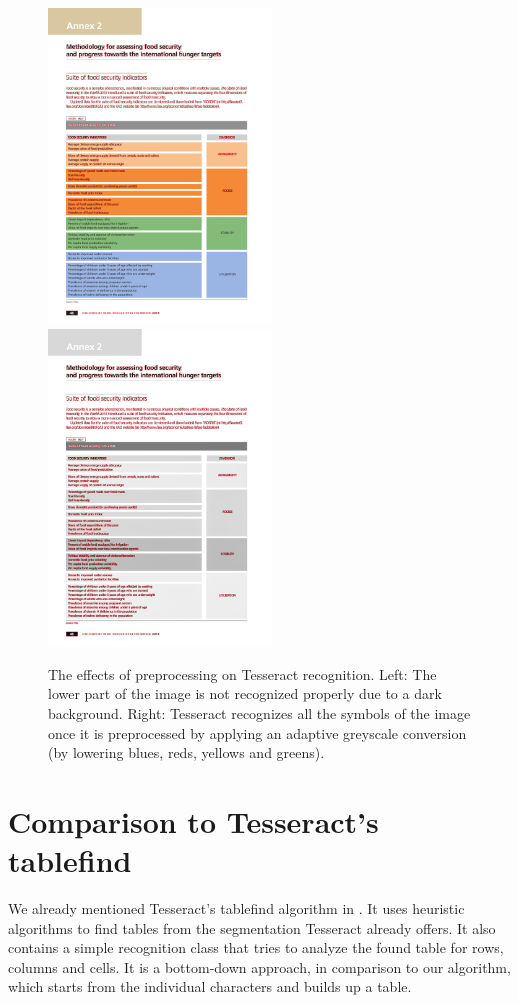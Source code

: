\begin{figure}[t]
\centering

\includegraphics[width=16em]{img/results/im2_noPreproc.png}
\includegraphics[width=16em]{img/results/im2_Preproc.png}

\caption{The effects of preprocessing on Tesseract recognition. Left: The lower part of the image is not recognized properly due to a dark background. Right: Tesseract recognizes all the symbols of the image once it is preprocessed by applying an adaptive greyscale conversion (by lowering blues, reds, yellows and greens).}
\label{fig:preprocessEffectsAdapt}
\end{figure}

\section{Comparison to Tesseract's tablefind}

We already mentioned Tesseract's tablefind algorithm in . It uses heuristic algorithms to find tables from the segmentation Tesseract already offers. It also contains a simple recognition class that tries to analyze the found table for rows, columns and cells. It is a bottom-down approach, in comparison to our algorithm, which starts from the individual characters and builds up a table.


